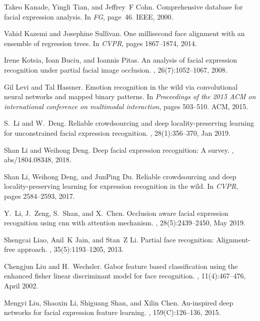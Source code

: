 \documentclass[journal]{IEEEtran}
\begin{document}
\begin{thebibliography}{10}
Takeo Kanade, Yingli Tian, and Jeffrey~F Cohn.
\newblock Comprehensive database for facial expression analysis.
\newblock In {\em FG}, page~46. IEEE, 2000.

Vahid Kazemi and Josephine Sullivan.
\newblock One millisecond face alignment with an ensemble of regression trees.
\newblock In {\em CVPR}, pages 1867--1874, 2014.

Irene Kotsia, Ioan Buciu, and Ioannis Pitas.
\newblock An analysis of facial expression recognition under partial facial
image occlusion.
, 26(7):1052--1067, 2008.

Gil Levi and Tal Hassner.
\newblock Emotion recognition in the wild via convolutional neural networks and
mapped binary patterns.
\newblock In {\em Proceedings of the 2015 ACM on international conference on
	multimodal interaction}, pages 503--510. ACM, 2015.

S.~{Li} and W.~{Deng}.
\newblock Reliable crowdsourcing and deep locality-preserving learning for
unconstrained facial expression recognition.
, 28(1):356--370, Jan
2019.

Shan Li and Weihong Deng.
\newblock Deep facial expression recognition: {A} survey.
, abs/1804.08348, 2018.

Shan Li, Weihong Deng, and JunPing Du.
\newblock Reliable crowdsourcing and deep locality-preserving learning for
expression recognition in the wild.
\newblock In {\em CVPR}, pages 2584--2593, 2017.

Y.~{Li}, J.~{Zeng}, S.~{Shan}, and X.~{Chen}.
\newblock Occlusion aware facial expression recognition using cnn with
attention mechanism.
, 28(5):2439--2450, May
2019.

Shengcai Liao, Anil~K Jain, and Stan~Z Li.
\newblock Partial face recognition: Alignment-free approach.
, 35(5):1193--1205, 2013.

Chengjun Liu and H.~Wechsler.
\newblock Gabor feature based classification using the enhanced fisher linear
discriminant model for face recognition.
, 11(4):467--476, April
2002.

Mengyi Liu, Shaoxin Li, Shiguang Shan, and Xilin Chen.
\newblock Au-inspired deep networks for facial expression feature learning.
, 159(C):126--136, 2015.


\end{thebibliography}
\end{document}

